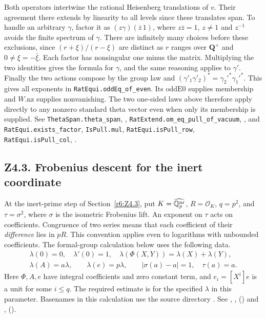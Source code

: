 Both operators intertwine the rational Heisenberg translations of $v$.
Their agreement there extends by linearity to all levels since these
translates span. To handle an arbitrary $\gamma$, factor it as
$(z\gamma)(\bar z\,1)$, where $z\bar z=1$, $z\ne1$ and $z^{-1}$ avoids
the finite spectrum of $\gamma$. There are infinitely many choices before
these exclusions, since $(r+\xi)/(r-\xi)$ are distinct as $r$ ranges
over $\mathbf Q^\times$ and $0\ne\xi=-\bar\xi$. Each factor has
nonsingular one minus the matrix. Multiplying the two identities gives
the formula for $\gamma$, and the same reasoning applies to $\gamma'$.
Finally the two actions compose by the group law and
$(\gamma'_1\gamma'_2)^*=\gamma_2'^*\gamma_1'^*$.
This gives all exponents in \nolinkurl{RatEqui.oddEq_of_even}.
Its $\mathrm{oddE0}$ supplies membership and $W.\mathrm{nz}$ supplies
nonvanishing. The two one-sided laws above therefore apply directly to any
nonzero standard theta vector even when only its membership is supplied.
See \nolinkurl{ThetaSpan.theta_span}, ,
\nolinkurl{RatExtend.om_eq_pull_of_vacuum}, ,
and \nolinkurl{RatEqui.exists_factor}, \nolinkurl{IsPull.mul},
\nolinkurl{RatEqui.isPull_row}, \nolinkurl{RatEqui.isPull_col},
.

\subsection*{Z4.3. Frobenius descent for the inert coordinate}
\label{r9:Z4.3}
At the inert-prime step of Section~\ref{r6:Z4.3}, put $K=\widehat{\mathbb Q_p^{\rm nr}}$,
$R=\mathcal O_K$, $q=p^2$, and $\tau=\sigma^2$, where $\sigma$ is the
isometric Frobenius lift. An exponent on $\tau$ acts on coefficients.
Congruence of two series means that each coefficient of their
\emph{difference} lies in $pR$. This convention applies even to
logarithms with unbounded coefficients. The formal-group calculation
below uses the following data.
\[
\begin{gathered}
 \lambda(0)=0,\quad\lambda'(0)=1,\quad
 \lambda(\Phi(X,Y))=\lambda(X)+\lambda(Y),\\
 \lambda(A)=a\lambda,\qquad \lambda(e)=p\lambda,\qquad
 |\sigma(a)-a|=1,\quad \tau(a)=a.
\end{gathered}
\]
Here $\Phi,A,e$ have integral coefficients and zero constant term,
and $e_i=[X^i]e$ is a unit for some $i\le q$.
The required estimate is for the specified $\lambda$ in this parameter.
Basenames in this calculation use the source directory
. See
, ,  () and
,  ().

